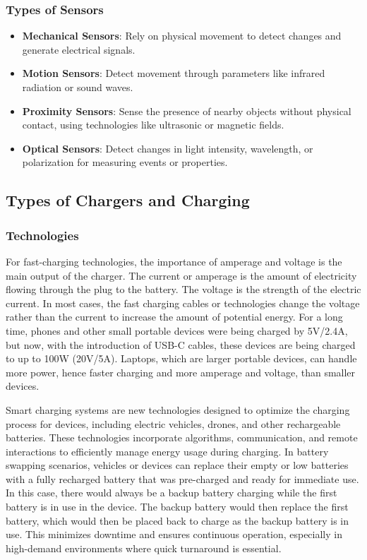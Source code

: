 \subsubsection{Types of Sensors}
\begin{itemize}
    \item \textbf{Mechanical Sensors}: Rely on physical movement to detect changes and generate electrical signals.
    \item \textbf{Motion Sensors}: Detect movement through parameters like infrared radiation or sound waves.
    \item \textbf{Proximity Sensors}: Sense the presence of nearby objects without physical contact, using technologies like ultrasonic or magnetic fields.
    \item \textbf{Optical Sensors}: Detect changes in light intensity, wavelength, or polarization for measuring events or properties.
\end{itemize}

\subsection{Types of Chargers and Charging}
\subsubsection{Technologies}
For fast-charging technologies, the importance of amperage and voltage is the main output of the charger. The current or amperage is the amount of electricity flowing through the plug to the battery. The voltage is the strength of the electric current. In most cases, the fast charging cables or technologies change the voltage rather than the current to increase the amount of potential energy. For a long time, phones and other small portable devices were being charged by 5V/2.4A, but now, with the introduction of USB-C cables, these devices are being charged to up to 100W (20V/5A). Laptops, which are larger portable devices, can handle more power, hence faster charging and more amperage and voltage, than smaller devices. 
\cite{fastchargers}

Smart charging systems are new technologies designed to optimize the charging process for devices, including electric vehicles, drones, and other rechargeable batteries. These technologies incorporate algorithms, communication, and remote interactions to efficiently manage energy usage during charging. In battery swapping scenarios, vehicles or devices can replace their empty or low batteries with a fully recharged battery that was pre-charged and ready for immediate use. In this case, there would always be a backup battery charging while the first battery is in use in the device. The backup battery would then replace the first battery, which would then be placed back to charge as the backup battery is in use. This minimizes downtime and ensures continuous operation, especially in high-demand environments where quick turnaround is essential. 
\cite{vehiclessmartcharge}

